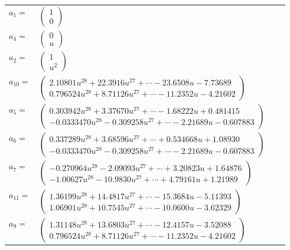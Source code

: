 \documentclass[1p]{elsarticle_modified}
\theoremstyle{definition}
\begin{document}
\begin{tabular}{m{7pt} m{180pt} m{7pt} m{180pt} }
\flushright $a_{1}=$&$\begin{pmatrix}1\\0\end{pmatrix}$ \\
\flushright $a_{4}=$&$\begin{pmatrix}0\\u\end{pmatrix}$ \\
\flushright $a_{2}=$&$\begin{pmatrix}1\\u^2\end{pmatrix}$ \\
\flushright $a_{10}=$&$\begin{pmatrix}2.10801 u^{28}+22.3916 u^{27}+\cdots-23.6508 u-7.73689\\0.796524 u^{28}+8.71126 u^{27}+\cdots-11.2352 u-4.21602\end{pmatrix}$ \\
\flushright $a_{5}=$&$\begin{pmatrix}0.303942 u^{28}+3.37670 u^{27}+\cdots-1.68222 u+0.481415\\-0.0333470 u^{28}-0.309258 u^{27}+\cdots-2.21689 u-0.607883\end{pmatrix}$ \\
\flushright $a_{6}=$&$\begin{pmatrix}0.337289 u^{28}+3.68596 u^{27}+\cdots+0.534668 u+1.08930\\-0.0333470 u^{28}-0.309258 u^{27}+\cdots-2.21689 u-0.607883\end{pmatrix}$ \\
\flushright $a_{7}=$&$\begin{pmatrix}-0.270964 u^{28}-2.09093 u^{27}+\cdots+3.20823 u+1.64876\\-1.00627 u^{28}-10.9830 u^{27}+\cdots+4.79161 u+1.21989\end{pmatrix}$ \\
\flushright $a_{11}=$&$\begin{pmatrix}1.36199 u^{28}+14.4817 u^{27}+\cdots-15.3684 u-5.11393\\1.06901 u^{28}+10.7545 u^{27}+\cdots-10.0600 u-3.62329\end{pmatrix}$ \\
\flushright $a_{9}=$&$\begin{pmatrix}1.31148 u^{28}+13.6803 u^{27}+\cdots-12.4157 u-3.52088\\0.796524 u^{28}+8.71126 u^{27}+\cdots-11.2352 u-4.21602\end{pmatrix}$ \\

\end{tabular}
\end{document}

